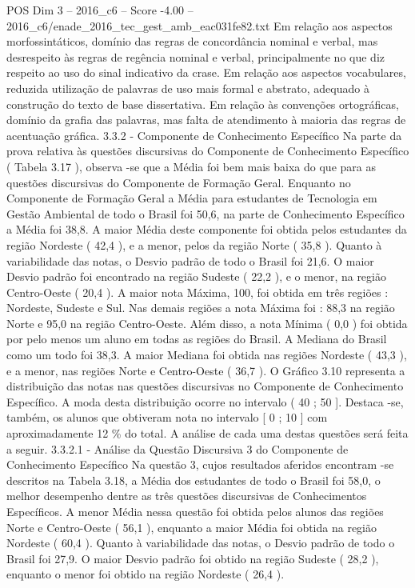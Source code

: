 \begin{textsample}{POS Dim 3 – 2016\_c6 – Score -4.00 – 2016\_c6/enade\_2016\_tec\_gest\_amb\_eac031fe82.txt}
Em relação aos aspectos morfossintáticos, domínio das regras de concordância nominal e verbal, mas desrespeito às regras de regência nominal e verbal, principalmente no que diz respeito ao uso do sinal indicativo da crase.
Em relação aos aspectos vocabulares, reduzida utilização de palavras de uso mais formal e abstrato, adequado à construção do texto de base dissertativa.
Em relação às convenções ortográficas, domínio da grafia das palavras, mas falta de atendimento à maioria das regras de acentuação gráfica. 3.3.2 - Componente de Conhecimento Específico Na parte da prova relativa às questões discursivas do Componente de Conhecimento Específico ( Tabela 3.17 ), observa -se que a Média foi bem mais baixa do que para as questões discursivas do Componente de Formação Geral.
Enquanto no Componente de Formação Geral a Média para estudantes de Tecnologia em Gestão Ambiental de todo o Brasil foi 50,6, na parte de Conhecimento Específico a Média foi 38,8.
A maior Média deste componente foi obtida pelos estudantes da região Nordeste ( 42,4 ), e a menor, pelos da região Norte ( 35,8 ).
Quanto à variabilidade das notas, o Desvio padrão de todo o Brasil foi 21,6.
O maior Desvio padrão foi encontrado na região Sudeste ( 22,2 ), e o menor, na região Centro-Oeste ( 20,4 ).
A maior nota Máxima, 100, foi obtida em três regiões : Nordeste, Sudeste e Sul.
Nas demais regiões a nota Máxima foi : 88,3 na região Norte e 95,0 na região Centro-Oeste.
Além disso, a nota Mínima ( 0,0 ) foi obtida por pelo menos um aluno em todas as regiões do Brasil.
A Mediana do Brasil como um todo foi 38,3.
A maior Mediana foi obtida nas regiões Nordeste ( 43,3 ), e a menor, nas regiões Norte e Centro-Oeste ( 36,7 ).
O Gráfico 3.10 representa a distribuição das notas nas questões discursivas no Componente de Conhecimento Específico.
A moda desta distribuição ocorre no intervalo ( 40 ; 50 ].
Destaca -se, também, os alunos que obtiveram nota no intervalo [ 0 ; 10 ] com aproximadamente 12 \% do total.
A análise de cada uma destas questões será feita a seguir. 3.3.2.1 - Análise da Questão Discursiva 3 do Componente de Conhecimento Específico Na questão 3, cujos resultados aferidos encontram -se descritos na Tabela 3.18, a Média dos estudantes de todo o Brasil foi 58,0, o melhor desempenho dentre as três questões discursivas de Conhecimentos Específicos.
A menor Média nessa questão foi obtida pelos alunos das regiões Norte e Centro-Oeste ( 56,1 ), enquanto a maior Média foi obtida na região Nordeste ( 60,4 ).
Quanto à variabilidade das notas, o Desvio padrão de todo o Brasil foi 27,9.
O maior Desvio padrão foi obtido na região Sudeste ( 28,2 ), enquanto o menor foi obtido na região Nordeste ( 26,4 ).

\end{textsample}
